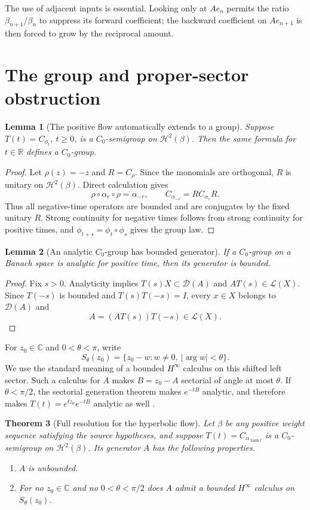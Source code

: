 \documentclass[10pt]{article}
\newtheorem{theorem}{Theorem}
\newtheorem{lemma}[theorem]{Lemma}
\newcommand{\Hbeta}{\mathcal H^2(\beta)}
\newcommand{\Lin}{\mathcal L}
\newcommand{\Dom}{\mathcal D}
\begin{document}
The use of adjacent inputs is essential.  Looking only at $Ae_n$ permits the
ratio $\beta_{n+1}/\beta_n$ to suppress its forward coefficient; the backward
coefficient on $Ae_{n+1}$ is then forced to grow by the reciprocal amount.

\section{The group and proper-sector obstruction}

\begin{lemma}[The positive flow automatically extends to a group]
Suppose $T(t)=C_{\phi_t}$, $t\geq0$, is a $C_0$-semigroup on $\Hbeta$.
Then the same formula for $t\in\mathbb R$ defines a $C_0$-group.
\end{lemma}

\begin{proof}
Let $\rho(z)=-z$ and $R=C_\rho$.  Since the monomials are orthogonal, $R$ is
unitary on $\Hbeta$.  Direct calculation gives
\[
 \rho\circ\alpha_r\circ\rho=\alpha_{-r},
 \qquad C_{\alpha_{-r}}=R C_{\alpha_r}R.
\]
Thus all negative-time operators are bounded and are conjugates by the fixed
unitary $R$.  Strong continuity for negative times follows from strong
continuity for positive times, and
$\phi_{t+s}=\phi_t\circ\phi_s$ gives the group law.
\end{proof}

\begin{lemma}[An analytic $C_0$-group has bounded generator]
If a $C_0$-group on a Banach space is analytic for positive time, then its
generator is bounded.
\end{lemma}

\begin{proof}
Fix $s>0$.  Analyticity implies
$T(s)X\subset\Dom(A)$ and $AT(s)\in\Lin(X)$.  Since $T(-s)$ is bounded and
$T(s)T(-s)=I$, every $x\in X$ belongs to $\Dom(A)$ and
\[
 A=(AT(s))T(-s)\in\Lin(X).
\]
\end{proof}

For $z_0\in\mathbb C$ and $0<\theta<\pi$, write
\[
 S_\theta(z_0)=\{z_0-w:w\neq0,\ |\arg w|<\theta\}.
\]
We use the standard meaning of a bounded $H^\infty$ calculus on this shifted
left sector.  Such a calculus for $A$ makes $B=z_0-A$ sectorial of angle at
most $\theta$.  If $\theta<\pi/2$, the sectorial generation theorem makes
$e^{-tB}$ analytic, and therefore makes
$T(t)=e^{tz_0}e^{-tB}$ analytic as well \cite{Haase}.

\begin{theorem}[Full resolution for the hyperbolic flow]\label{thm:main}
Let $\beta$ be any positive weight sequence satisfying the source
hypotheses, and suppose $T(t)=C_{\alpha_{\tanh t}}$ is a $C_0$-semigroup on
$\Hbeta$.  Its generator $A$ has the following properties.
\begin{enumerate}
\item $A$ is unbounded.
\item For no $z_0\in\mathbb C$ and no $0<\theta<\pi/2$ does $A$ admit a
bounded $H^\infty$ calculus on $S_\theta(z_0)$.
\end{enumerate}
\end{theorem}
\end{document}
